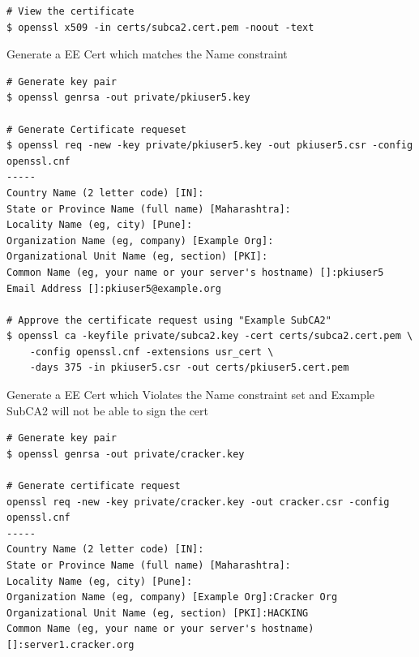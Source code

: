 \documentclass[12pt]{report}
\begin{document}
\begin{enumerate}[label*=\arabic*.]
\begin{lstlisting}[style=bashInputStyle]
# View the certificate
$ openssl x509 -in certs/subca2.cert.pem -noout -text
            \end{lstlisting}
            Generate a EE Cert which matches the Name constraint 
            \begin{lstlisting}[style=bashInputStyle]
# Generate key pair
$ openssl genrsa -out private/pkiuser5.key

# Generate Certificate requeset
$ openssl req -new -key private/pkiuser5.key -out pkiuser5.csr -config openssl.cnf
-----
Country Name (2 letter code) [IN]:
State or Province Name (full name) [Maharashtra]:
Locality Name (eg, city) [Pune]:
Organization Name (eg, company) [Example Org]:
Organizational Unit Name (eg, section) [PKI]:
Common Name (eg, your name or your server's hostname) []:pkiuser5
Email Address []:pkiuser5@example.org

# Approve the certificate request using "Example SubCA2"
$ openssl ca -keyfile private/subca2.key -cert certs/subca2.cert.pem \ 
    -config openssl.cnf -extensions usr_cert \
    -days 375 -in pkiuser5.csr -out certs/pkiuser5.cert.pem    
            \end{lstlisting}
            Generate a EE Cert which Violates the Name constraint set and Example SubCA2
            will not be able to sign the cert
            \begin{lstlisting}[style=bashInputStyle]
# Generate key pair
$ openssl genrsa -out private/cracker.key

# Generate certificate request
openssl req -new -key private/cracker.key -out cracker.csr -config openssl.cnf
-----
Country Name (2 letter code) [IN]:
State or Province Name (full name) [Maharashtra]:
Locality Name (eg, city) [Pune]:
Organization Name (eg, company) [Example Org]:Cracker Org
Organizational Unit Name (eg, section) [PKI]:HACKING
Common Name (eg, your name or your server's hostname) []:server1.cracker.org


\end{lstlisting}
\end{enumerate}
\end{document}

